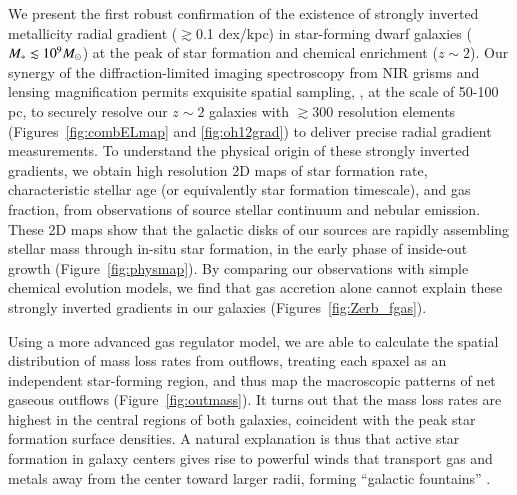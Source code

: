 We present the first robust confirmation of the existence of strongly inverted metallicity radial gradient (\ie $\gtrsim$0.1 
dex/kpc) in star-forming dwarf galaxies ($M_\ast\lesssim10^9M_\odot$) at the peak of star formation and chemical enrichment 
($z\sim2$).
Our synergy of the diffraction-limited imaging spectroscopy from \hst NIR grisms and lensing magnification permits exquisite 
spatial sampling, \ie, at the scale of 50-100 pc, to securely resolve our $z\sim2$ galaxies with $\gtrsim$300 resolution elements 
(Figures~\ref{fig:combELmap} and \ref{fig:oh12grad}) to deliver precise radial gradient measurements.
To understand the physical origin of these strongly inverted gradients, we obtain high resolution 2D maps of star formation rate, 
characteristic stellar age (or equivalently star formation timescale), and gas fraction, from \hst observations of source stellar 
continuum and nebular emission.
These 2D maps show that the galactic disks of our sources are rapidly assembling stellar mass through in-situ star formation, in 
the early phase of inside-out growth (Figure~\ref{fig:physmap}).
By comparing our observations with simple chemical evolution models, we find that gas accretion alone cannot explain these 
strongly inverted gradients in our galaxies (Figures~\ref{fig:Zerb_fgas}).

Using a more advanced gas regulator model, we are able to calculate the spatial distribution of mass loss rates from outflows, 
treating each spaxel as an independent star-forming region, and thus map the macroscopic patterns of net gaseous outflows 
(Figure~\ref{fig:outmass}).
It turns out that the mass loss rates are highest in the central regions of both galaxies, coincident with
the peak star formation surface densities.
A natural explanation is thus that active star formation in galaxy centers gives rise to powerful winds that transport gas and
metals away from the center toward larger radii, forming ``galactic fountains'' \citep{Martin:2002ee}.

